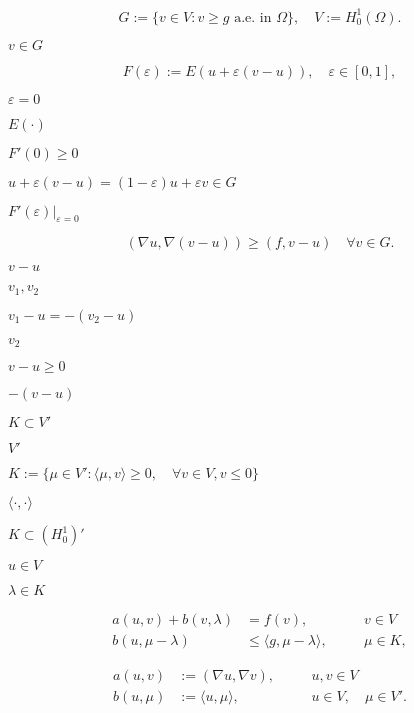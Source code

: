 \documentclass{article}
\begin{document}
\begin{equation*} G:=\lbrace v\in V: v\geq g \text{ a.e. in } \Omega\rbrace,\quad V:=H^1_0(\Omega). \end{equation*}
\pagebreak

$v\in G$
\pagebreak

\begin{equation*} F(\varepsilon) := E(u+\varepsilon(v-u)),\quad\varepsilon\in\left[0,1\right], \end{equation*}
\pagebreak

$\varepsilon = 0$
\pagebreak

$E(\cdot)$
\pagebreak

$F'(0)\geq 0$
\pagebreak

$u+\varepsilon(v-u) = (1-\varepsilon)u+\varepsilon v\in G$
\pagebreak

$F'(\varepsilon)\vert_{\varepsilon=0}$
\pagebreak

\begin{equation*} \left(\nabla u, \nabla(v-u)\right) \geq \left(f,v-u\right) \quad \forall v\in G. \end{equation*}
\pagebreak

$v-u$
\pagebreak

$v_1,v_2$
\pagebreak

$v_1-u = -(v_2-u)$
\pagebreak

$v_2$
\pagebreak

$v-u\ge 0$
\pagebreak

$-(v-u)$
\pagebreak

$K\subset V'$
\pagebreak

$V'$
\pagebreak

$K:=\{\mu\in V': \langle\mu,v\rangle\geq 0,\quad \forall v\in V, v \le 0 \}$
\pagebreak

$\langle\cdot,\cdot\rangle$
\pagebreak

$K\subset (H_0^1)'$
\pagebreak

$u\in V$
\pagebreak

$\lambda\in K$
\pagebreak

\begin{align*} a(u,v) + b(v,\lambda) &= f(v),\quad &&v\in V\\ b(u,\mu - \lambda) &\leq \langle g,\mu - \lambda\rangle,\quad&&\mu\in K, \end{align*}
\pagebreak

\begin{align*} a(u,v) &:= \left(\nabla u, \nabla v\right),\quad &&u,v\in V\\ b(u,\mu) &:= \langle u,\mu\rangle,\quad &&u\in V,\quad\mu\in V'. \end{align*}
\pagebreak
\end{document}
